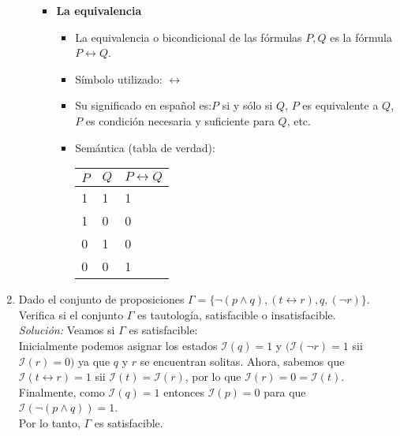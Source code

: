 \documentclass[letterpaper,11pt]{article}
\begin{document}
\begin{enumerate}
\begin{itemize}
\begin{itemize}
                \newpage
                \item \textbf{La equivalencia}
                \begin{itemize}
                    \item La equivalencia o bicondicional de las fórmulas 
                    $P, Q$ es la fórmula $P \leftrightarrow Q$.
                    \item Símbolo utilizado: $\leftrightarrow$
                    \item Su significado en español es:$P$ si y sólo si $Q$,
                    $P$ es equivalente a $Q$, $P$ es condición necesaria y
                    suficiente para $Q$, etc.
                    \item Semántica (tabla de verdad):
                    \begin{table}[htbp]
                        \begin{center}
                        \begin{tabular}{|l|l|l|}
                        \hline
                        $P$ & $Q$ & $P \leftrightarrow Q$ \\
                        \hline \hline 
                        1 & 1 & 1 \\ \hline
                        1 & 0 & 0 \\ \hline
                        0 & 1 & 0 \\ \hline
                        0 & 0 & 1 \\  \hline
                        \end{tabular}
                        \end{center}
                    \end{table}  

                \end{itemize}

            \end{itemize}
            
        \end{itemize}

        \item Dado el conjunto de proposiciones 
        $\Gamma = \{ \neg (p \land q), (t \leftrightarrow r), q, (\neg r) \}$.
        Verifica si el conjunto $\Gamma$ es tautología, satisfacible o
        insatisfacible. \\
        \textit{Solución:} Veamos si $\Gamma$ es satisfacible: \\
        Inicialmente podemos asignar los estados $\mathcal{I}(q) = 1$ y
        $(\mathcal{I}(\neg r) = 1$ sii $\mathcal{I}(r) = 0)$ ya que $q$ y $r$
        se encuentran solitas. Ahora, sabemos que 
        $\mathcal{I}(t \leftrightarrow r) = 1$ sii 
        $\mathcal{I}(t) = \mathcal{I}(r)$, por lo que 
        $\mathcal{I}(r) = 0 = \mathcal{I}(t)$. Finalmente, como 
        $\mathcal{I}(q) = 1$ entonces $\mathcal{I}(p) = 0$ para que 
        $\mathcal{I}(\neg (p \land q)) = 1$. \\
        Por lo tanto, $\Gamma$ es satisfacible. \\ \\


\end{enumerate}
\end{document}

